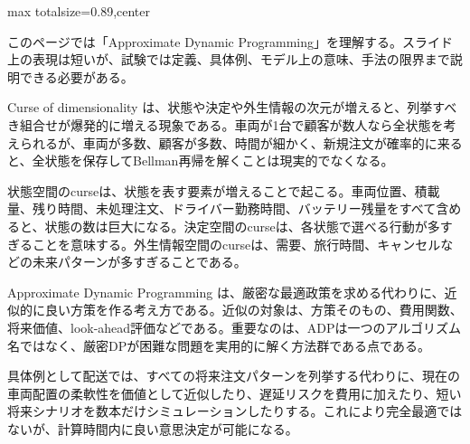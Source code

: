 \begin{minipage}[t]{0.58\textwidth}
\begin{adjustbox}{max totalsize={\textwidth}{0.89\textheight},center}
\begin{minipage}{\textwidth}\scriptsize
{}このページでは「Approximate Dynamic Programming」を理解する。スライド上の表現は短いが、試験では定義、具体例、モデル上の意味、手法の限界まで説明できる必要がある。\par
Curse of dimensionality は、状態や決定や外生情報の次元が増えると、列挙すべき組合せが爆発的に増える現象である。車両が1台で顧客が数人なら全状態を考えられるが、車両が多数、顧客が多数、時間が細かく、新規注文が確率的に来ると、全状態を保存してBellman再帰を解くことは現実的でなくなる。\par
状態空間のcurseは、状態を表す要素が増えることで起こる。車両位置、積載量、残り時間、未処理注文、ドライバー勤務時間、バッテリー残量をすべて含めると、状態の数は巨大になる。決定空間のcurseは、各状態で選べる行動が多すぎることを意味する。外生情報空間のcurseは、需要、旅行時間、キャンセルなどの未来パターンが多すぎることである。\par
Approximate Dynamic Programming は、厳密な最適政策を求める代わりに、近似的に良い方策を作る考え方である。近似の対象は、方策そのもの、費用関数、将来価値、look-ahead評価などである。重要なのは、ADPは一つのアルゴリズム名ではなく、厳密DPが困難な問題を実用的に解く方法群である点である。\par
具体例として配送では、すべての将来注文パターンを列挙する代わりに、現在の車両配置の柔軟性を価値として近似したり、遅延リスクを費用に加えたり、短い将来シナリオを数本だけシミュレーションしたりする。これにより完全最適ではないが、計算時間内に良い意思決定が可能になる。\par

\end{minipage}
\end{adjustbox}
\end{minipage}
